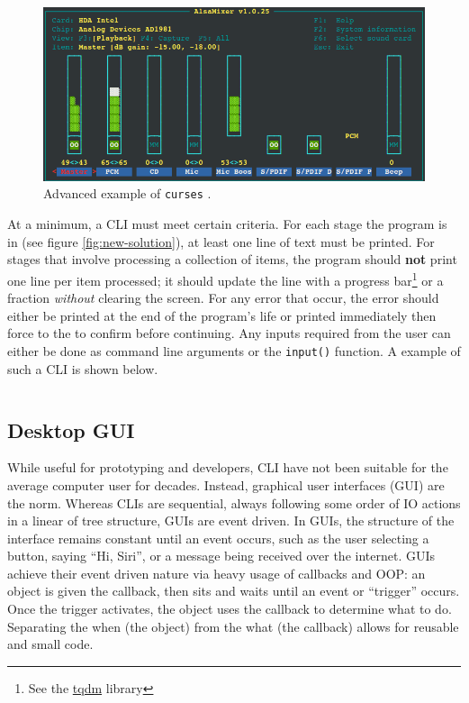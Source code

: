 \documentclass[11pt]{article}
\begin{document}
\begin{figure}[b!]
    \centering
    \includegraphics[width=\textwidth]{figures/ncurses_example.png}
    \caption{Advanced example of \texttt{curses} \cite{curses-api}.}
    \label{fig:ncurses-example}
\end{figure}

At a minimum, a CLI must meet certain criteria. For each stage the program is in (see figure \ref{fig:new-solution}), at least one line of text must be printed. For stages that involve processing a collection of items, the program should \textbf{not} print one line per item processed; it should update the line with a progress bar\footnote{See the \href{https://pypi.org/project/tqdm/}{tqdm} library} or a fraction \textit{without} clearing the screen. For any error that occur, the error should either be printed at the end of the program's life or printed immediately then force to the to confirm before continuing. Any inputs required from the user can either be done as command line arguments or the \texttt{input()} function. A example of such a CLI is shown below.

\inputminted[]{shell}{cli_examples/simple_cli.txt}

\subsection{Desktop GUI}

While useful for prototyping and developers, CLI have not been suitable for the average computer user for decades. Instead, graphical user interfaces (GUI) are the norm. Whereas CLIs are sequential, always following some order of IO actions in a linear of tree structure, GUIs are event driven. In GUIs, the structure of the interface remains constant until an event occurs, such as the user selecting a button, saying ``Hi, Siri'', or a message being received over the internet. GUIs achieve their event driven nature via heavy usage of callbacks and OOP: an object is given the callback, then sits and waits until an event or ``trigger'' occurs. Once the trigger activates, the object uses the callback to determine what to do. Separating the when (the object) from the what (the callback) allows for reusable and small code.
\end{document}

